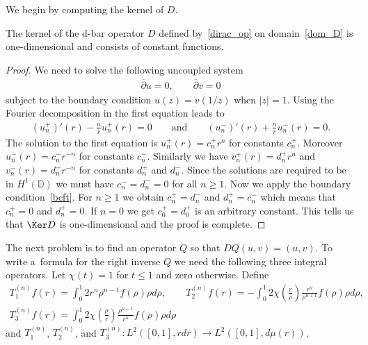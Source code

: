 We begin by computing the kernel of $D$.

\begin{prop}
The kernel of the d-bar operator $D$ defined by~\eqref{dirac_op} on domain~\eqref{dom_D} is one-dimensional and consists
of constant functions.
\end{prop}

\begin{proof}
We need to solve the following uncoupled system
\begin{gather*}
\overline{\partial}u = 0,
\qquad
\overline{\partial}v = 0
\end{gather*}
subject to the boundary condition $u(z)=v(1/z)$ when $|z|=1$.
Using the Fourier decomposition in the f\/irst equation leads to
\begin{gather*}
(u_n^+)'(r) - \frac{n}{r} u_n^+(r) = 0
\qquad
\textrm{and}
\qquad
(u_n^-)'(r) + \frac{n}{r} u_n^-(r) = 0.
\end{gather*}
The solution to the f\/irst equation is $u_n^+(r) = c_n^+ r^n$ for constants $c_n^+$.
Moreover $u_n^-(r) = c_n^-r^{-n}$ for constants $c_n^-$.
Similarly we have $v_n^+(r) = d_n^+r^n$ and $v_n^-(r) = d_n^-r^{-n}$ for constants $d_n^+$ and $d_n^-$.
Since the solutions are required to be in $H^1({\mathbb D})$ we must have $c_n^- = d_n^- = 0$ for all $n\ge 1$.
Now we apply the boundary condition~\eqref{bcft}.
For $n\ge1$ we obtain $c_n^+ = d_n^-$ and $d_n^+ = c_n^-$ which means that $c_n^+ = 0$ and $d_n^+ = 0$.
If $n=0$ we get $c_0^+=d_0^+$ is an arbitrary constant.
This tells us that $\Ker D$ is one-dimensional and the proof is complete.
\end{proof}

The next problem is to f\/ind an operator $Q$ so that $DQ(u,v)=(u,v)$.
To write a~formula for the right inverse $Q$ we need the following three integral operators.
Let $\chi(t)=1$ for $t\le1$ and zero otherwise.
Def\/ine
\begin{gather}
T_1^{(n)}f(r) = \int_0^1 2r^n\rho^{n-1}f(\rho)\rho d\rho,
\qquad
T_2^{(n)}f(r) = -\int_0^1 2\chi\left(\frac{r}{\rho}\right)\frac{r^n}{\rho^{n+1}}f(\rho)\rho d\rho,
\nonumber
\\
T_3^{(n)}f(r) = \int_0^1 2\chi\left(\frac{\rho}{r}\right)\frac{\rho^{n-1}}{r^n}f(\rho)\rho d\rho
\label{int_ops_cont}
\end{gather}
and $T_1^{(n)}$, $T_2^{(n)}$, and $T_3^{(n)}: L^2([0,1], rdr)\to L^2([0,1], d\mu(r))$.

